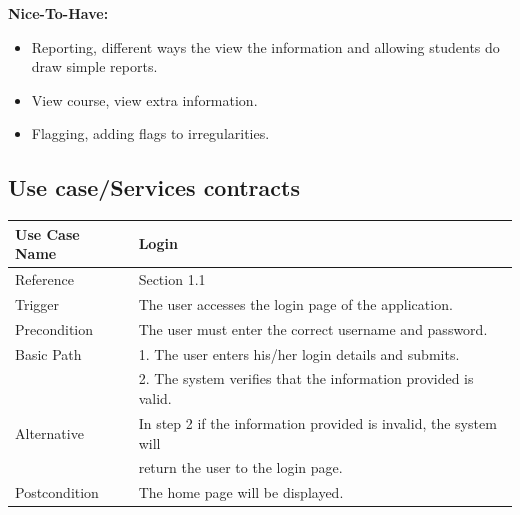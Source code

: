 \documentclass[10pt,a4paper]{article}
\begin{document}
\textbf{Nice-To-Have:}
 \begin{itemize}
	\item Reporting, different ways the view the information and allowing students do draw simple reports.

	\item View course, view extra information.

	\item Flagging, adding flags to irregularities.
 \end{itemize}


\subsection{Use case/Services contracts}
 \begin{tabular}{|l|l|}\hline
                        Use Case Name   & Login \\\hline
                        Reference & Section 1.1\\\hline
                        Trigger & The user accesses the login page of the application.\\\hline
                        Precondition & The user must enter the correct username and password.\\\hline
                        Basic Path & 1.	The user enters his/her login details and submits. 
                        \\\linebreak &
                        2.	 The system verifies that the information provided is valid.
                        \\\hline
                        Alternative & In step 2 if the information provided is invalid, the system will
                        \\\linebreak & return the user to the login page.\\\hline
                        Postcondition & The home page will be displayed.\\\hline
                \end{tabular} 
                
\end{document}
